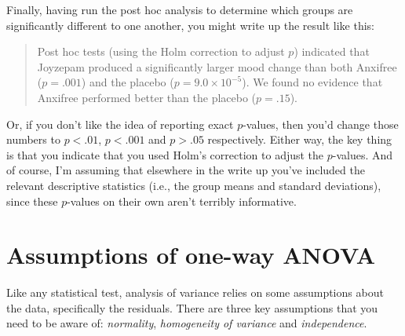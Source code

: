 
Finally, having run the post hoc analysis to determine which groups are significantly different to one another, you might write up the result like this:
\begin{quote}
Post hoc tests (using the Holm correction to adjust $p$) indicated that Joyzepam produced a significantly larger mood change than both Anxifree ($p = .001$) and the placebo ($p = 9.0 \times 10^{-5}$). We found no evidence that Anxifree performed better than the placebo ($p = .15$).
\end{quote}
Or, if you don't like the idea of reporting exact $p$-values, then you'd change those numbers to $p<.01$, $p<.001$ and $p > .05$ respectively. Either way, the key thing is that you indicate that you used Holm's correction to adjust the $p$-values. And of course, I'm assuming that elsewhere in the write up you've included the relevant descriptive statistics (i.e., the group means and standard deviations), since these $p$-values on their own aren't terribly informative. 


\section{Assumptions of one-way ANOVA \label{sec:anovaassumptions}}

Like any statistical test, analysis of variance relies on some assumptions about the data, specifically the residuals. There are three key assumptions that you need to be aware of: {\it normality}, {\it homogeneity of variance} and {\it independence}. 

